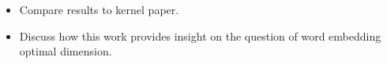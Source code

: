 \begin{itemize}
	\item Compare results to kernel paper.
	\item Discuss how this work provides insight on the question of word embedding optimal dimension.
\end{itemize}